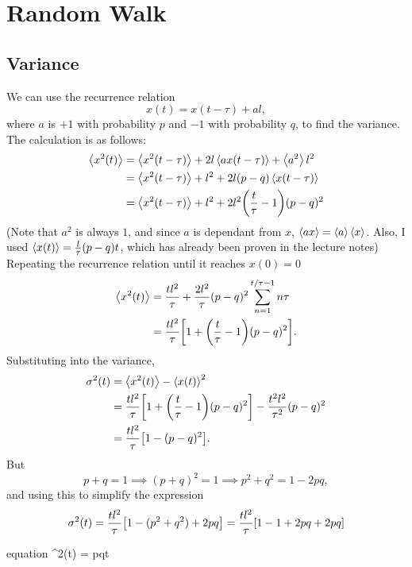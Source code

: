 \documentclass[12pt,a4paper]{article}
\begin{document}
	\section{Random Walk}
	\subsection{Variance}
	We can use the recurrence relation
	\begin{equation}
		x(t) = x(t-\tau) + al,
	\end{equation}
	where $a$ is $+1$ with probability $p$ and $-1$ with probability $q$, to find the variance.
	The calculation is as follows:
	\begin{align}
		\expval{x^2(t)} &= \expval{x^2(t-\tau)} + 2l\expval{ax(t-\tau)} + \expval{a^2}l^2 \\
		&= \expval{x^2(t-\tau)} + l^2 + 2l(p - q)\expval{x(t-\tau)} \\
		&= \expval{x^2(t-\tau)} + l^2 + 2l^2\qty(\frac{t}{\tau}-1)(p - q)^2
	\end{align}
	(Note that $a^2$ is always $1$, and since $a$ is dependant from $x$, $\expval{ax} = \expval{a}\expval{x}$.
	Also, I used $\expval{x(t)} = \frac{l}{\tau}(p-q)t$, which has already been proven in the lecture notes) \\
	Repeating the recurrence relation until it reaches $x(0) = 0$
	\begin{align}
		\expval{x^2(t)} &= \frac{tl^2}{\tau} + \frac{2l^2}{\tau}(p - q)^2 \sum_{n=1}^{t/\tau - 1} n\tau \\
		&= \frac{tl^2}{\tau}\qty[1 + \qty(\frac{t}{\tau} - 1)(p - q)^2].
	\end{align}
	Substituting into the variance,
	\begin{align}
		\sigma^2(t) &= \expval{x^2(t)} - \expval{x(t)}^2 \\
		&= \frac{tl^2}{\tau}\qty[1 + \qty(\frac{t}{\tau} - 1)(p - q)^2] - \frac{t^2l^2}{\tau^2}(p-q)^2 \\
		&= \frac{tl^2}{\tau}\qty[1 - (p - q)^2].
	\end{align}
	But
	\begin{equation}
		p+q = 1 \implies (p+q)^2 = 1 \implies p^2 + q^2 = 1 - 2pq,
	\end{equation}
	and using this to simplify the expression
	\begin{equation}
		\sigma^2(t) = \frac{tl^2}{\tau}\qty[1 - (p^2 + q^2) + 2pq] = \frac{tl^2}{\tau}\qty[1 - 1 + 2pq + 2pq]
	\end{equation}
	\begin{empheq}[box=\fbox]{equation}
		\sigma^2(t) = pqt
	\end{empheq}
\end{document}
